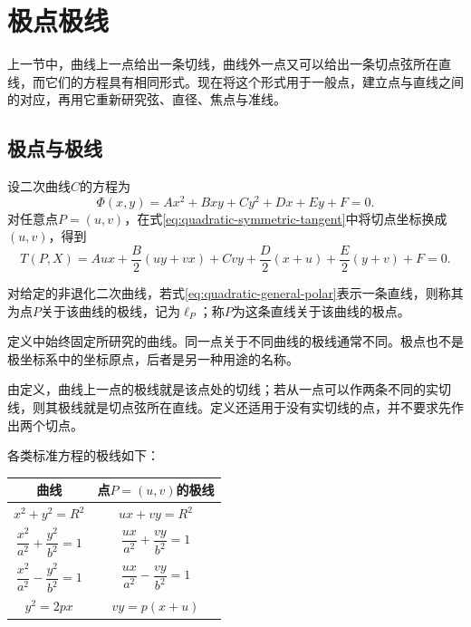 \newpage
\section{极点极线}
\label{sec:quadratic-poles-and-polars}

上一节中，曲线上一点给出一条切线，曲线外一点又可以给出一条切点弦所在直线，而它们的方程具有相同形式。现在将这个形式用于一般点，建立点与直线之间的对应，再用它重新研究弦、直径、焦点与准线。

\subsection{极点与极线}
\label{subsec:quadratic-poles-and-polars}

设二次曲线\(C\)的方程为
\begin{equation*}
 \Phi(x,y)=Ax^2+Bxy+Cy^2+Dx+Ey+F=0.
\end{equation*}
对任意点\(P=(u,v)\)，在式\eqref{eq:quadratic-symmetric-tangent}中将切点坐标换成\((u,v)\)，得到
\begin{equation}\label{eq:quadratic-general-polar}
 T(P,X)=Aux+\frac B2(uy+vx)+Cvy
 +\frac D2(x+u)+\frac E2(y+v)+F=0.
\end{equation}

\begin{definition}
对给定的非退化二次曲线，若式\eqref{eq:quadratic-general-polar}表示一条直线，则称其为点\(P\)关于该曲线的{\heiti{}极线}，记为\(\ell_P\)；称\(P\)为这条直线关于该曲线的{\heiti{}极点}。
\end{definition}

定义中始终固定所研究的曲线。同一点关于不同曲线的极线通常不同。极点也不是极坐标系中的坐标原点，后者是另一种用途的名称。

由定义，曲线上一点的极线就是该点处的切线；若从一点可以作两条不同的实切线，则其极线就是切点弦所在直线。定义还适用于没有实切线的点，并不要求先作出两个切点。

各类标准方程的极线如下：
\begin{center}
\renewcommand{\arraystretch}{1.65}
\begin{tabular}{c|c}
曲线 & 点\(P=(u,v)\)的极线 \\ \hline
\(x^2+y^2=R^2\) & \(ux+vy=R^2\) \\
\(\dfrac{x^2}{a^2}+\dfrac{y^2}{b^2}=1\) & \(\dfrac{ux}{a^2}+\dfrac{vy}{b^2}=1\) \\
\(\dfrac{x^2}{a^2}-\dfrac{y^2}{b^2}=1\) & \(\dfrac{ux}{a^2}-\dfrac{vy}{b^2}=1\) \\
\(y^2=2px\) & \(vy=p(x+u)\)
\end{tabular}
\end{center}

